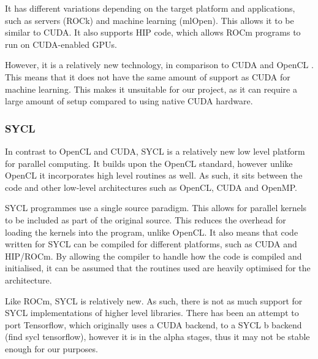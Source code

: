 It has different variations depending on the target platform and applications, such as servers (ROCk) and machine learning (mlOpen).
This allows it to be similar to CUDA.
It also supports HIP code, which allows ROCm programs to run on CUDA-enabled GPUs.

However, it is a relatively new technology, in comparison to CUDA and OpenCL \cite{rocminsights}.
This means that it does not have the same amount of support as CUDA for machine learning.
This makes it unsuitable for our project, as it can require a large amount of setup compared to using native CUDA hardware.




\subsubsection{SYCL}
In contrast to OpenCL and CUDA, SYCL is a relatively new low level platform for parallel computing.
It builds upon the OpenCL standard, however unlike OpenCL it incorporates high level routines as well.
As such, it sits between the code and other low-level architectures such as OpenCL, CUDA and OpenMP.

SYCL programmes use a single source paradigm.
This allows for parallel kernels to be included as part of the original source.
This reduces the overhead for loading the kernels into the program, unlike OpenCL.  
It also means that code written for SYCL can be compiled for different platforms, such as CUDA and HIP/ROCm. 
By allowing the compiler to handle how the code is compiled and initialised, it can be assumed that the routines used are heavily optimised for the architecture.

Like ROCm, SYCL is relatively new.
As such, there is not as much support for SYCL implementations of higher level libraries.
There has been an attempt to port Tensorflow, which originally uses a CUDA backend, to a SYCL b backend (find sycl tensorflow), however it is in the alpha stages, thus it may not be stable enough for our purposes.  



